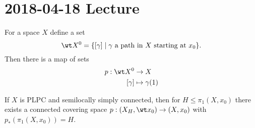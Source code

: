 \section{2018-04-18 Lecture}

\begin{defn}
	For a space $X$ define a set
	\[\wt X^0 = \{[\gamma] \mid \gamma \text{ a path in } X \text{ starting at } x_0\}.\]
	Then there is a map of sets
	\begin{align*}
		p: \wt X^0 &\to X \\
		[\gamma] &\mapsto \gamma(1)
	\end{align*}
\end{defn}

\begin{prop}
	If $X$ is PLPC and semilocally simply connected, then for $H \leq \pi_1(X,x_0)$ there exists a connected covering space $p:(X_H,\wt x_0) \to (X,x_0)$ with $p_*(\pi_1(X,x_0))=H$.
\end{prop}

